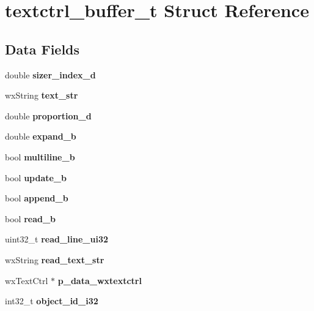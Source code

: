 \section{textctrl\+\_\+buffer\+\_\+t Struct Reference}
\label{structtextctrl__buffer__t}
\subsection*{Data Fields}
\begin{DoxyCompactItemize}
\item 
\mbox{\label{structtextctrl__buffer__t_aae99f717aadbf88f890c71a293468af8}} 
double {\bfseries sizer\+\_\+index\+\_\+d}
\item 
\mbox{\label{structtextctrl__buffer__t_ae027b01a16a8b9ded760f0ead4d7a951}} 
wx\+String {\bfseries text\+\_\+str}
\item 
\mbox{\label{structtextctrl__buffer__t_a93e3ac3895fbb25863fb66af78e0ed39}} 
double {\bfseries proportion\+\_\+d}
\item 
\mbox{\label{structtextctrl__buffer__t_a40506be5f1249944fed816e11465f5ca}} 
double {\bfseries expand\+\_\+b}
\item 
\mbox{\label{structtextctrl__buffer__t_ae5854a5758c53720942a5824073237ca}} 
bool {\bfseries multiline\+\_\+b}
\item 
\mbox{\label{structtextctrl__buffer__t_a4aed9ad79f44786d35de6f7804904494}} 
bool {\bfseries update\+\_\+b}
\item 
\mbox{\label{structtextctrl__buffer__t_a603e0044550d3a3487d43ff2f7f76b39}} 
bool {\bfseries append\+\_\+b}
\item 
\mbox{\label{structtextctrl__buffer__t_aec360f35fd6f559471a94d02c6fb0f66}} 
bool {\bfseries read\+\_\+b}
\item 
\mbox{\label{structtextctrl__buffer__t_ad6d9e9d3e47f7acfd6835ccc72099e97}} 
uint32\+\_\+t {\bfseries read\+\_\+line\+\_\+ui32}
\item 
\mbox{\label{structtextctrl__buffer__t_af38bb322070a2fb7ad8bda9f9bbb6c60}} 
wx\+String {\bfseries read\+\_\+text\+\_\+str}
\item 
\mbox{\label{structtextctrl__buffer__t_a42b4ee7696692815a2feac9f1e4e9e9a}} 
wx\+Text\+Ctrl $\ast$ {\bfseries p\+\_\+data\+\_\+wxtextctrl}
\item 
\mbox{\label{structtextctrl__buffer__t_aa7683407966206b7eb17d410ee75d880}} 
int32\+\_\+t {\bfseries object\+\_\+id\+\_\+i32}
\end{DoxyCompactItemize}


